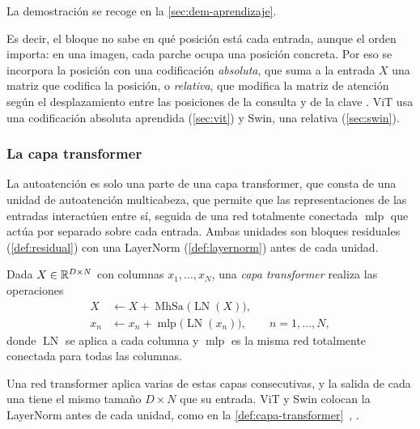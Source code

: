 La demostración se recoge en la \cref{sec:dem-aprendizaje}.

Es decir, el bloque no sabe en qué posición está cada entrada, aunque el orden importa: en una imagen, cada parche ocupa una posición concreta.
Por eso se incorpora la posición con una codificación \emph{absoluta}, que suma a la entrada $X$ una matriz que codifica la posición, o
\emph{relativa}, que modifica la matriz de atención según el desplazamiento entre las posiciones de la consulta y de la clave
\cite[sec.~12.3.1]{prince2023understanding}. ViT usa una codificación absoluta aprendida (\cref{sec:vit}) y Swin, una relativa
(\cref{sec:swin}).

\subsubsection{La capa transformer}\label{sec:capa-transformer}

La autoatención es solo una parte de una capa transformer, que consta de una
unidad de autoatención multicabeza, que permite que las representaciones de las
entradas interactúen entre sí, seguida de una red totalmente conectada
$\operatorname{mlp}$ que actúa por separado sobre cada entrada. Ambas unidades
son bloques residuales (\cref{def:residual}) con una LayerNorm
(\cref{def:layernorm}) antes de cada unidad.

\begin{definicion}\label{def:capa-transformer}
Dada $X\in\mathbb{R}^{D\times N}$ con columnas $x_1,\dots,x_N$, una \emph{capa
transformer} realiza las operaciones
\begin{align*}
  X   &\leftarrow X + \operatorname{MhSa}\bigl(\operatorname{LN}(X)\bigr),\\
  x_n &\leftarrow x_n + \operatorname{mlp}\bigl(\operatorname{LN}(x_n)\bigr), \qquad n = 1,\dots,N,
\end{align*}
donde $\operatorname{LN}$ se aplica a cada columna y $\operatorname{mlp}$ es la
misma red totalmente conectada para todas las columnas.
\end{definicion}

Una red transformer aplica varias de estas capas consecutivas, y la salida de cada una tiene el mismo tamaño $D\times N$ que su entrada.
ViT y Swin colocan la LayerNorm antes de cada unidad, como en la
\cref{def:capa-transformer}~\cite[ecs.~(2)--(3)]{dosovitskiy2021}, \cite[ec.~(3)]{liu2021swin}.

